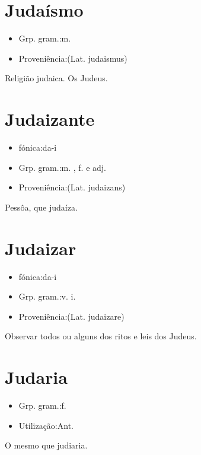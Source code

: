 \documentclass{article}
\begin{document}
\section{Judaísmo}
\begin{itemize}
\item {Grp. gram.:m.}
\end{itemize}
\begin{itemize}
\item {Proveniência:(Lat. \textunderscore judaismus\textunderscore )}
\end{itemize}
Religião judaica.
Os Judeus.
\section{Judaizante}
\begin{itemize}
\item {fónica:da-i}
\end{itemize}
\begin{itemize}
\item {Grp. gram.:m. ,  f.  e  adj.}
\end{itemize}
\begin{itemize}
\item {Proveniência:(Lat. \textunderscore judaizans\textunderscore )}
\end{itemize}
Pessôa, que judaíza.
\section{Judaizar}
\begin{itemize}
\item {fónica:da-i}
\end{itemize}
\begin{itemize}
\item {Grp. gram.:v. i.}
\end{itemize}
\begin{itemize}
\item {Proveniência:(Lat. \textunderscore judaizare\textunderscore )}
\end{itemize}
Observar todos ou alguns dos ritos e leis dos Judeus.
\section{Judaria}
\begin{itemize}
\item {Grp. gram.:f.}
\end{itemize}
\begin{itemize}
\item {Utilização:Ant.}
\end{itemize}
O mesmo que \textunderscore judiaria\textunderscore .
\end{document}

